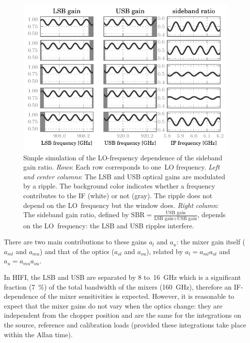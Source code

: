\begin{figure}
    \centering
    \includegraphics{lo_scan_of_ripple}
    \caption{
        Simple simulation of the LO-frequency dependence of the sideband gain ratio.
        \emph{Rows}:
            Each row corresponds to one~LO frequency.
        \emph{Left and center columns}:
            The LSB and USB optical gains are modulated by a ripple.
            The background color indicates whether a frequency
            contributes to the IF (white) or not (gray).
            The ripple does not depend on the LO~frequency but the window does.
        \emph{Right column}:
            The sideband gain ratio,
            defined by
            $\text{SBR}=\frac{\text{USB gain}}{\text{LSB gain}+\text{USB gain}}$,
            depends on the LO~frequency:
            the LSB and USB ripples interfere.
    }
    \label{fig:lo_scan_of_ripple}
\end{figure}

There are two main contributions to these gains $a_l$ and $a_u$:
the mixer gain itself ($a_{ml}$ and $a_{mu}$)
and that of the optics ($a_{ol}$ and $a_{ou}$), related by
$a_l = a_{ml} a_{ol}$ and $a_u = a_{mu} a_{ou}$.

In HIFI, the LSB and USB are separated by \num{8} to~\SI{16}{\giga\hertz}
which is a significant fraction (\SI{7}{\percent}) of the total bandwidth of the mixers (\SI{160}{\giga\hertz}),
therefore an IF-dependence of the mixer sensitivities is expected.
However, it is reasonable to expect that the mixer gains do not vary when the optics change: they are independent from the chopper position and are the same for the integrations on the source, reference and calibration loads (provided these integrations take place within the Allan time).

